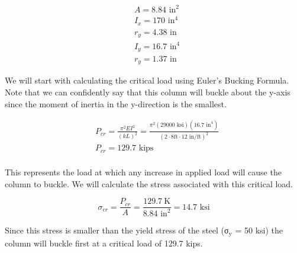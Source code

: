\documentclass[
  letterpaper,
  DIV=11,
  numbers=noendperiod]{scrreprt}
\begin{document}
\begin{tcolorbox}
\begin{tcolorbox}
\[
\begin{aligned}
& A=8.84 \text{ in}^2 \\
& I_x=170 \text{ in}^4 \\
& r_y=4.38 \text{ in} \\
& I_y=16.7 \text{ in}^4 \\
& r_y=1.37 \text{ in}
\end{aligned}
\]

We will start with calculating the critical load using Euler's Bucking
Formula. Note that we can confidently say that this column will buckle
about the y-axis since the moment of inertia in the y-direction is the
smallest.

\[
\begin{aligned}
& P_{cr}=\frac{\pi^2 E I^2}{(k L)^2}=\frac{\pi^2(29000 \text{ ksi})\left(16.7{\text{ in}^4}\right)}{\left(2 \cdot 8 \mathrm{ft} \cdot 12{\text{ in/ft}}\right)^2} \\
& P_{c r}=129.7 \text { kips} \\
&
\end{aligned}
\]

This represents the load at which any increase in applied load will
cause the column to buckle. We will calculate the stress associated with
this critical load.

\[
\sigma_{c r}=\frac{P_{cr}}{A}=\frac{129.7 \mathrm{~K}}{8.84 \text{ in}^2}=14.7 \text{ ksi}
\]

Since this stress is smaller than the yield stress of the steel
(σ\textsubscript{y} = 50 ksi) the column will buckle first at a critical
load of 129.7 kips.

\end{tcolorbox}

\end{tcolorbox}
\end{document}
